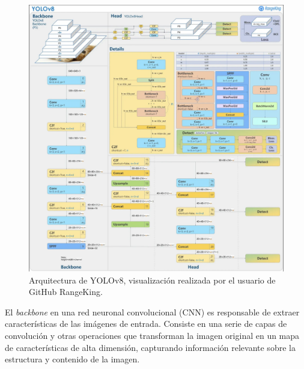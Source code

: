 \begin{figure}
    \centering
    \includegraphics[width=1\textwidth]{../img/yolov8-arq.png}
    \caption{Arquitectura de YOLOv8, visualización realizada por el usuario de GitHub RangeKing\cite{RangeKing_GitHub}.}
    \label{fig:YOLOv8_architecture}
\end{figure}

El \textit{backbone} en una red neuronal convolucional (CNN) es responsable de extraer características de las imágenes de entrada. Consiste en una serie de capas de convolución y otras operaciones que transforman la imagen original en un mapa de características de alta dimensión, capturando información relevante sobre la estructura y contenido de la imagen.

